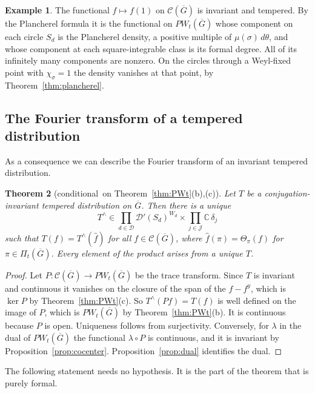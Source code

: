 \documentclass[12pt,letterpaper]{article}
\numberwithin{equation}{section}
\newtheorem{theorem}{Theorem}[section]
\theoremstyle{definition}
\newtheorem{xexample}[theorem]{Example}
\newcommand{\cond}{conditional}
\newcommand{\C}{\mathbb C}
\newcommand{\bG}{\overline{G}}
\newcommand{\calC}{\mathcal C}
\newcommand{\calD}{\mathcal D}
\newcommand{\Pit}{\Pi_{t}(\bG)}
\begin{document}
\begin{xexample}\label{ex:plancherel}
The functional $f\mapsto f(1)$ on $\calC(\bG)$ is invariant and tempered.  By the
Plancherel formula \cite[Corollaire~2.6.5]{Li12} it is the functional on $PW_t(\bG)$ whose
component on each circle $S_d$ is the Plancherel density, a positive multiple of
$\mu(\sigma)\,d\theta$, and whose component at each square-integrable class is its formal
degree.  All of its infinitely many components are nonzero.  On the circles through a
Weyl-fixed point with $\chi_\sigma=1$ the density vanishes at that point, by
Theorem~\ref{thm:plancherel}.
\end{xexample}

\subsection{The Fourier transform of a tempered distribution}

As a consequence we can describe the Fourier transform of an invariant tempered
distribution.

\begin{theorem}[\cond\ on Theorem~\ref{thm:PWt}(b),(c)]\label{thm:FT-dist}
Let $T$ be a conjugation-invariant tempered distribution on $\bG$.  Then there is a unique
\[
T^\wedge\in\prod_{d\in\mathcal D}\calD'(S_d)^{W_d}\times\prod_{j\in\mathcal J}\C\,\delta_j
\]
such that $T(f)=T^\wedge(\hat f)$ for all $f\in\calC(\bG)$, where $\hat f(\pi)=\Theta_\pi(f)$
for $\pi\in\Pit$.  Every element of the product arises from a unique $T$.
\end{theorem}
\begin{proof}
Let $P:\calC(\bG)\to PW_t(\bG)$ be the trace transform.  Since $T$ is invariant and
continuous it vanishes on the closure of the span of the $f-f^y$, which is $\ker P$ by
Theorem~\ref{thm:PWt}(c).  So $T^\wedge(Pf)=T(f)$ is well defined on the image of $P$,
which is $PW_t(\bG)$ by Theorem~\ref{thm:PWt}(b).  It is continuous because $P$ is open.
Uniqueness follows from surjectivity.  Conversely, for $\lambda$ in the dual of
$PW_t(\bG)$ the functional $\lambda\circ P$ is continuous, and it is invariant by
Proposition~\ref{prop:cocenter}.  Proposition~\ref{prop:dual} identifies the dual.
\end{proof}

The following statement needs no hypothesis.  It is the part of the theorem that is
purely formal.
\end{document}
